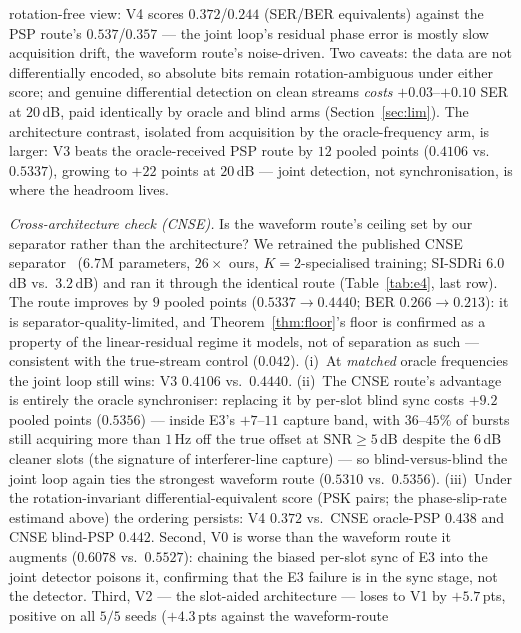\documentclass[journal]{IEEEtran}
\newcommand{\snr}{\mathrm{SNR}}
\begin{document}
rotation-free view: V4 scores $0.372$/$0.244$ (SER/BER equivalents)
against the PSP route's $0.537$/$0.357$ --- the joint loop's residual
phase error is mostly slow acquisition drift, the waveform route's
noise-driven. Two caveats: the data are not differentially encoded, so
absolute bits remain rotation-ambiguous under either score; and genuine
differential detection on clean streams \emph{costs}
$+0.03$--$+0.10$ SER at $20$\,dB, paid identically by oracle and blind
arms (Section~\ref{sec:lim}). The architecture
contrast, isolated from acquisition by the oracle-frequency arm, is
larger: V3 beats the oracle-received PSP route by $12$ pooled points
($0.4106$ vs.\ $0.5337$), growing to $+22$ points at $20$\,dB ---
joint detection, not synchronisation, is where the headroom lives.

\emph{Cross-architecture check (CNSE).} Is the waveform route's
ceiling set by our separator rather than the architecture? We
retrained the published CNSE separator~\cite{hou2022single} ($6.7$M
parameters, $26\times$ ours, $K{=}2$-specialised training; SI-SDRi
$6.0$\,dB vs.\ $3.2$\,dB) and ran
it through the identical route (Table~\ref{tab:e4}, last row). The
route improves by $9$ pooled points ($0.5337 \to 0.4440$; BER $0.266
\to 0.213$): it is separator-quality-limited, and
Theorem~\ref{thm:floor}'s floor is confirmed as a property of the
linear-residual regime it models, not of separation as such ---
consistent with the true-stream control ($0.042$).
(i)~At \emph{matched}
oracle frequencies the joint loop still wins: V3 $0.4106$ vs.\
$0.4440$. (ii)~The CNSE route's advantage is entirely the oracle
synchroniser: replacing it by per-slot blind sync costs $+9.2$ pooled
points ($0.5356$) --- inside E3's $+7$--$11$ capture band, with
$36$--$45\%$ of bursts still acquiring more than $1$\,Hz off the true
offset at
$\snr \geq 5$\,dB despite the $6$\,dB cleaner slots (the signature of
interferer-line capture) --- so
blind-versus-blind the joint loop again ties the strongest waveform
route ($0.5310$ vs.\ $0.5356$). (iii)~Under the rotation-invariant
differential-equivalent score (PSK pairs; the phase-slip-rate estimand
above) the ordering persists: V4 $0.372$ vs.\ CNSE oracle-PSP $0.438$
and CNSE blind-PSP $0.442$.
Second, V0 is
worse than the waveform route it augments ($0.6078$ vs.\ $0.5527$):
chaining the biased
per-slot sync of E3 into the joint detector poisons it, confirming
that the E3 failure is in the sync stage, not the detector. Third, V2
--- the slot-aided architecture --- loses to V1 by $+5.7$\,pts,
positive on all $5/5$ seeds ($+4.3$\,pts against the waveform-route
\end{document}
